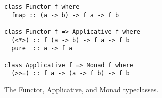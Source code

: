 \begin{verbatim}
class Functor f where
  fmap :: (a -> b) -> f a -> f b

class Functor f => Applicative f where
  (<*>) :: f (a -> b) -> f a -> f b
  pure  :: a -> f a

class Applicative f => Monad f where
  (>>=) :: f a -> (a -> f b) -> f b
\end{verbatim}
\caption{The Functor, Applicative, and Monad typeclasses.}
